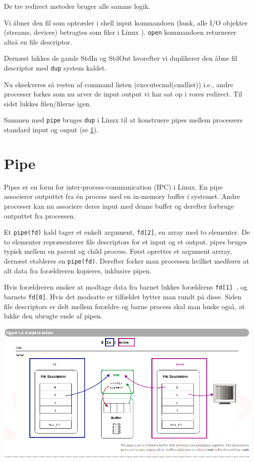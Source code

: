 \documentclass[danish]{report}
\begin{document}
De tre redirect metoder bruger alle samme logik. 

Vi åbner den fil som optræder i shell input kommandoen (husk, alle I/O objekter (streams, devices) betragtes som filer i Linux ).  {\tt open} kommandoen returnerer altså en file descriptor. 

Dernæst lukkes de gamle StdIn og StdOut hvorefter vi duplikerer den åbne fil descriptor med {\tt dup} system kaldet. 

Nu eksekveres så resten af command listen (executecmd(cmdlist)) i.e., andre processer forkes som nu arver de input output vi har sat op i vores redirect. Til sidst lukkes filen/filerne  igen. 

Sammen med {\tt pipe} bruges {\tt dup} i Linux til at konstruere pipes mellem processers standard input og ouput (se \ref{pipe}).


\section{Pipe}
\label{pipe}


Pipes er en form for inter-process-communication (IPC) i Linux. En pipe associerer outputtet fra én process med en in-memory buffer i systemet. Andre processer kan nu associere deres input med denne buffer og derefter forbruge outputtet fra processen. 

Et {\tt pipe(fd)} kald tager et enkelt argument, {\tt fd[2]}, en array med to elementer. De to elementer repræsenterer file descriptors for et input og et output. pipes bruges typisk mellem en parent og child process. Først oprettes et argument arrray, dernæst etableres en {\tt pipe(fd)}. Derefter forker man processen hvilket medfører at alt data fra forældreren kopieres, inklusive pipen. 

Hvis forældreren ønsker at modtage data fra barnet lukkes forældrens {\tt fd[1] }, og barnets {\tt fd[0]}. Hvis det modsatte er tilfældet bytter man  rundt på disse. Siden file descriptors er delt mellem forældre og barne process skal man huske også, at lukke den ubrugte ende af pipen.


\includegraphics[scale=0.5]{pipe}
\end{document}

